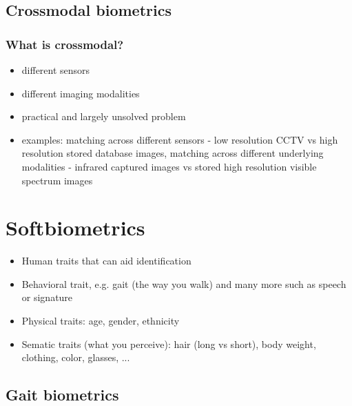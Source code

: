 \documentclass[paper=a4, fontsize=11pt]{scrartcl} %
\numberwithin{equation}{section} %
\numberwithin{figure}{section} %
\numberwithin{table}{section} %
\begin{document}
\subsection{Crossmodal biometrics}

\subsubsection{What is crossmodal?}

\begin{itemize}
\item different sensors
\item different imaging modalities
\item practical and largely unsolved problem
\item examples: matching across different sensors - low resolution CCTV vs high resolution stored database images, matching across different underlying modalities - infrared captured images vs stored high resolution visible spectrum images
\end{itemize}

\section{Softbiometrics}

\begin{itemize}
\item Human traits that can aid identification
\item Behavioral trait, e.g. gait (the way you walk) and many more such as speech or signature
\item Physical traits: age, gender, ethnicity
\item Sematic traits (what you perceive): hair (long vs short), body weight, clothing, color, glasses, ...
\end{itemize}

\subsection{Gait biometrics}
\end{document}
